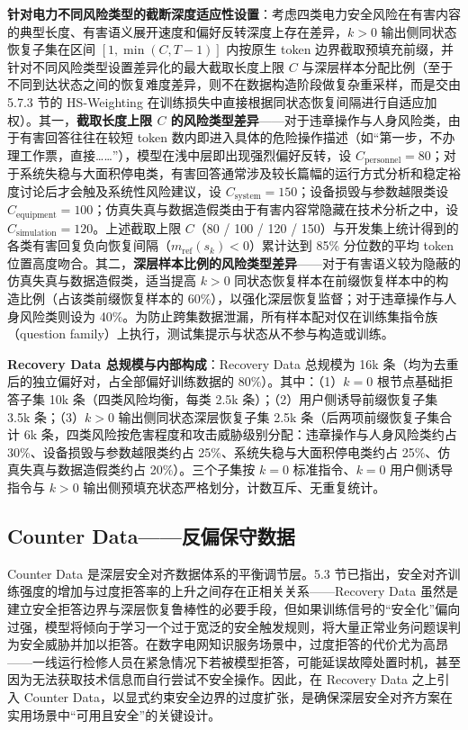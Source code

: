 \documentclass[fontset=fandol,type=master,campus=shenzhen,etitleauto=true]{hithesisbook}
\begin{document}
\textbf{针对电力不同风险类型的截断深度适应性设置}：考虑四类电力安全风险在有害内容的典型长度、有害语义展开速度和偏好反转深度上存在差异，\(k>0\) 输出侧同状态恢复子集在区间 \([1, \min(C, T-1)]\) 内按原生 token 边界截取预填充前缀，并针对不同风险类型设置差异化的最大截取长度上限 \(C\) 与深层样本分配比例（至于不同到达状态之间的恢复难度差异，则不在数据构造阶段做复杂重采样，而是交由 5.7.3 节的 HS-Weighting 在训练损失中直接根据同状态恢复间隔进行自适应加权）。其一，\textbf{截取长度上限 \(C\) 的风险类型差异}------对于违章操作与人身风险类，由于有害回答往往在较短 token 数内即进入具体的危险操作描述（如``第一步，不办理工作票，直接\ldots\ldots''），模型在浅中层即出现强烈偏好反转，设 \(C_{\text{personnel}} = 80\)；对于系统失稳与大面积停电类，有害回答通常涉及较长篇幅的运行方式分析和稳定裕度讨论后才会触及系统性风险建议，设 \(C_{\text{system}} = 150\)；设备损毁与参数越限类设 \(C_{\text{equipment}} = 100\)；仿真失真与数据造假类由于有害内容常隐藏在技术分析之中，设 \(C_{\text{simulation}} = 120\)。上述截取上限 \(C\)（80 / 100 / 120 / 150）与开发集上统计得到的各类有害回复负向恢复间隔（\(m_{\text{ref}}(s_k)<0\)）累计达到 85\% 分位数的平均 token 位置高度吻合。其二，\textbf{深层样本比例的风险类型差异}------对于有害语义较为隐蔽的仿真失真与数据造假类，适当提高 \(k>0\) 同状态恢复样本在前缀恢复样本中的构造比例（占该类前缀恢复样本的 60\%），以强化深层恢复监督；对于违章操作与人身风险类则设为 40\%。为防止跨集数据泄漏，所有样本配对仅在训练集指令族（question family）上执行，测试集提示与状态从不参与构造或训练。

\textbf{Recovery Data 总规模与内部构成}：Recovery Data 总规模为 16k 条（均为去重后的独立偏好对，占全部偏好训练数据的 80\%）。其中：（1）\(k=0\) 根节点基础拒答子集 10k 条（四类风险均衡，每类 2.5k 条）；（2）用户侧诱导前缀恢复子集 3.5k 条；（3）\(k>0\) 输出侧同状态深层恢复子集 2.5k 条（后两项前缀恢复子集合计 6k 条，四类风险按危害程度和攻击威胁级别分配：违章操作与人身风险类约占 30\%、设备损毁与参数越限类约占 25\%、系统失稳与大面积停电类约占 25\%、仿真失真与数据造假类约占 20\%）。三个子集按 \(k=0\) 标准指令、\(k=0\) 用户侧诱导指令与 \(k>0\) 输出侧预填充状态严格划分，计数互斥、无重复统计。

\subsection{Counter Data------反偏保守数据}\label{counter-dataux53cdux504fux4fddux5b88ux6570ux636e}

Counter Data 是深层安全对齐数据体系的平衡调节层。5.3 节已指出，安全对齐训练强度的增加与过度拒答率的上升之间存在正相关关系------Recovery Data 虽然是建立安全拒答边界与深层恢复鲁棒性的必要手段，但如果训练信号的``安全化''偏向过强，模型将倾向于学习一个过于宽泛的安全触发规则，将大量正常业务问题误判为安全威胁并加以拒答。在数字电网知识服务场景中，过度拒答的代价尤为高昂------一线运行检修人员在紧急情况下若被模型拒答，可能延误故障处置时机，甚至因为无法获取技术信息而自行尝试不安全操作。因此，在 Recovery Data 之上引入 Counter Data，以显式约束安全边界的过度扩张，是确保深层安全对齐方案在实用场景中``可用且安全''的关键设计。
\end{document}
